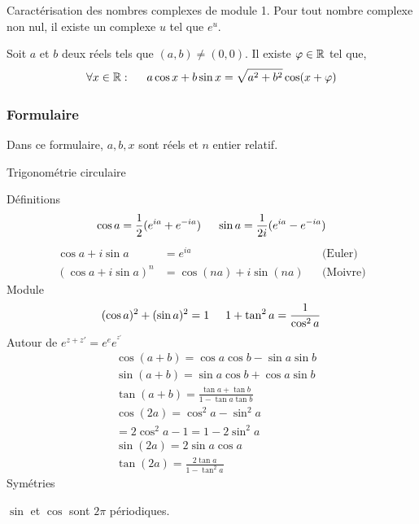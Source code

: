 Caractérisation des nombres complexes de module 1. Pour tout nombre complexe non nul, il existe un complexe $u$ tel que $e^u$.
\begin{prop}
 Soit $a$ et $b$ deux réels tels que $(a,b)\neq(0,0)$. Il existe $\varphi\in\mathbb{R}$ tel que, 
\begin{displaymath}
 \forall x\in \mathbb{R}: \hspace{0.5cm} a\cos x + b\sin x = \sqrt{a^2+b^2}\cos(x+\varphi) 
\end{displaymath}
\end{prop}

\subsubsection{Formulaire}
Dans ce formulaire, $a, b, x$ sont réels et $n$ entier relatif.
\twocolumn
\begin{center}
 Trigonométrie circulaire
\end{center}
Définitions
\begin{displaymath}
  \cos a  = \frac{1}{2}(e^{ia}+e^{-ia}) \hspace{0.5cm} \sin a  = \frac{1}{2i}(e^{ia}-e^{-ia})
\end{displaymath}
\begin{align*}
  \cos a + i \sin a  &= e^{ia}& &\text{(Euler)}\\
  (\cos a + i \sin a)^n &= \cos(na) + i \sin(na)& &\text{(Moivre)}
\end{align*}
Module
\begin{displaymath}
 (\cos a)^2 + (\sin a)^2 = 1 \hspace{0.5cm} 1+\tan^2a = \frac{1}{\cos^2 a}
\end{displaymath}
Autour de $e^{z+z'}=e^{e}e^{^{z'}}$
\begin{align*}
 &\cos(a+b) = \cos a \cos b  - \sin a \sin b\\
 &\sin(a+b) = \sin a \cos b + \cos a \sin b \\
 &\tan(a+b) = \frac{\tan a + \tan b}{1-\tan a \tan b}\\
 &\cos(2a) = \cos^2 a -\sin^2 a \\
 &         =2\cos^2 a -1 = 1-2\sin^2a\\
 &\sin(2a) = 2\sin a \cos a \\
 &\tan(2a) = \frac{2\tan a }{1-\tan^2 a}
\end{align*}
Symétries

$\sin$ et $\cos$ sont $2\pi$ périodiques.

